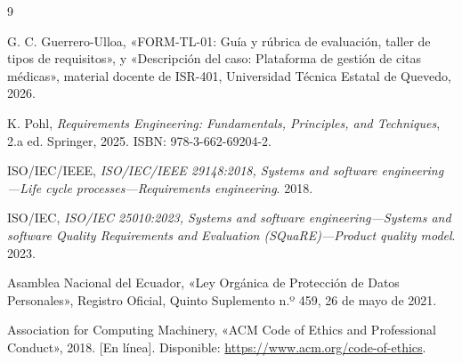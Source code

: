 \documentclass[12pt,a4paper]{article}
\begin{document}
\renewcommand{\refname}{9. Referencias}
\footnotesize
\begin{thebibliography}{9}

G. C. Guerrero-Ulloa, «FORM-TL-01: Guía y rúbrica de evaluación, taller de tipos de requisitos», y «Descripción del caso: Plataforma de gestión de citas médicas», material docente de ISR-401, Universidad Técnica Estatal de Quevedo, 2026.

K. Pohl, \emph{Requirements Engineering: Fundamentals, Principles, and Techniques}, 2.a ed. Springer, 2025. ISBN: 978-3-662-69204-2.

ISO/IEC/IEEE, \emph{ISO/IEC/IEEE 29148:2018, Systems and software engineering---Life cycle processes---Requirements engineering}. 2018.

ISO/IEC, \emph{ISO/IEC 25010:2023, Systems and software engineering---Systems and software Quality Requirements and Evaluation (SQuaRE)---Product quality model}. 2023.

Asamblea Nacional del Ecuador, «Ley Orgánica de Protección de Datos Personales», Registro Oficial, Quinto Suplemento n.º 459, 26 de mayo de 2021.

Association for Computing Machinery, «ACM Code of Ethics and Professional Conduct», 2018. [En línea]. Disponible: \url{https://www.acm.org/code-of-ethics}.

\end{thebibliography}
\normalsize
\end{document}
